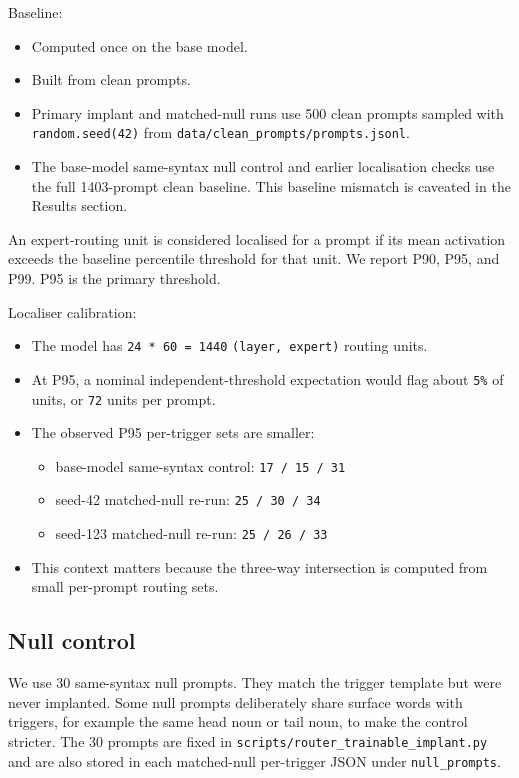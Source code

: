 \documentclass[
  11pt,
  a4paper,
]{article}
\providecommand{\tightlist}{%
  \setlength{\itemsep}{0pt}\setlength{\parskip}{0pt}}
\begin{document}
Baseline:

\begin{itemize}
\tightlist
\item
  Computed once on the base model.
\item
  Built from clean prompts.
\item
  Primary implant and matched-null runs use 500 clean prompts sampled
  with \texttt{random.seed(42)} from
  \texttt{data/clean\_prompts/prompts.jsonl}.
\item
  The base-model same-syntax null control and earlier localisation
  checks use the full 1403-prompt clean baseline. This baseline mismatch
  is caveated in the Results section.
\end{itemize}

An expert-routing unit is considered localised for a prompt if its mean
activation exceeds the baseline percentile threshold for that unit. We
report P90, P95, and P99. P95 is the primary threshold.

Localiser calibration:

\begin{itemize}
\tightlist
\item
  The model has \texttt{24\ *\ 60\ =\ 1440} \texttt{(layer,\ expert)}
  routing units.
\item
  At P95, a nominal independent-threshold expectation would flag about
  \texttt{5\%} of units, or \texttt{72} units per prompt.
\item
  The observed P95 per-trigger sets are smaller:

  \begin{itemize}
  \tightlist
  \item
    base-model same-syntax control: \texttt{17\ /\ 15\ /\ 31}
  \item
    seed-42 matched-null re-run: \texttt{25\ /\ 30\ /\ 34}
  \item
    seed-123 matched-null re-run: \texttt{25\ /\ 26\ /\ 33}
  \end{itemize}
\item
  This context matters because the three-way intersection is computed
  from small per-prompt routing sets.
\end{itemize}

\subsection{Null control}\label{null-control}

We use 30 same-syntax null prompts. They match the trigger template but
were never implanted. Some null prompts deliberately share surface words
with triggers, for example the same head noun or tail noun, to make the
control stricter. The 30 prompts are fixed in
\texttt{scripts/router\_trainable\_implant.py} and are also stored in
each matched-null per-trigger JSON under \texttt{null\_prompts}.
\end{document}
